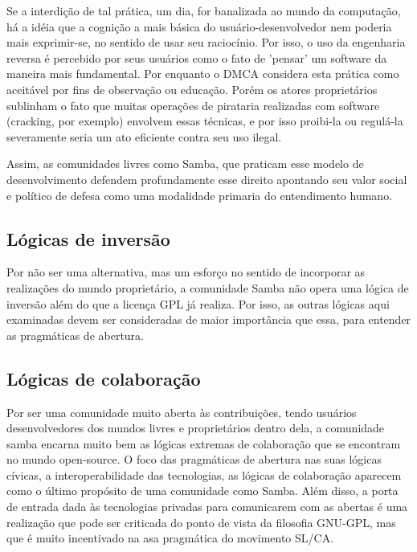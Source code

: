 Se a interdição de tal prática, um dia, for banalizada ao mundo da computação, há a idéia que a cognição a mais básica do usuário-desenvolvedor nem poderia mais exprimir-se, no sentido de usar seu raciocínio. Por isso, o uso da engenharia reversa é percebido por seus usuários como o fato de 'pensar' um software da maneira mais fundamental. Por enquanto o DMCA considera esta prática como aceitável por fins de observação ou educação. Porém os atores proprietários sublinham o fato que muitas operações de pirataria realizadas com software (cracking, por exemplo) envolvem essas técnicas, e por isso proibi-la ou regulá-la  severamente seria um ato eficiente contra seu uso ilegal.

Assim, as comunidades livres como Samba, que praticam esse modelo de desenvolvimento defendem profundamente esse direito apontando seu valor social e político de defesa como uma modalidade primaria do entendimento humano.

\subsection{Lógicas de inversão} \label{3.3.3}

Por não ser uma alternativa, mas um esforço no sentido de incorporar as realizações do mundo proprietário, a comunidade Samba não opera uma lógica de inversão além do que a licença GPL já realiza. Por isso, as outras lógicas aqui examinadas devem ser consideradas de maior importância que essa, para entender as pragmáticas de abertura.

\subsection{Lógicas de colaboração} \label{3.3.4}

Por ser uma comunidade muito aberta às contribuições, tendo usuários desenvolvedores dos mundos livres e proprietários dentro dela, a comunidade samba encarna muito bem as lógicas extremas de colaboração que se encontram no mundo open-source. O foco das pragmáticas de abertura nas suas lógicas cívicas, a interoperabilidade das tecnologias, as lógicas de colaboração aparecem como o último propósito de uma comunidade como Samba. Além disso, a porta de entrada dada às tecnologias privadas para comunicarem com as abertas é uma realização que pode ser criticada do ponto de vista da filosofia GNU-GPL, mas que é muito incentivado na asa pragmática do movimento SL/CA.

